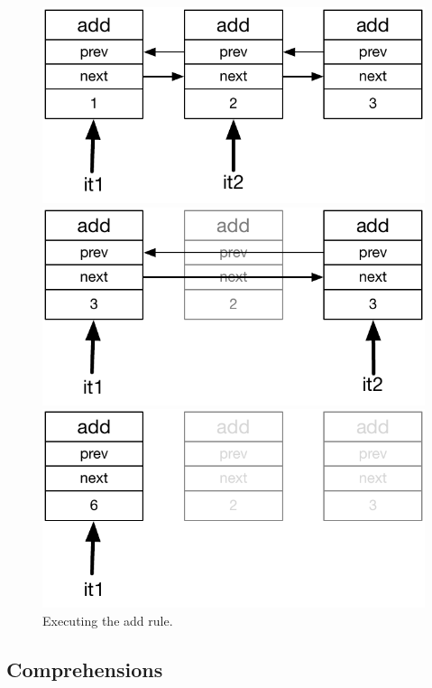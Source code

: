 \begin{figure}
\centering
\begin{minipage}{.5\textwidth}
  \centering
  \includegraphics[width=.8\linewidth]{figures/update}
\end{minipage}%
\begin{minipage}{.5\textwidth}
  \centering
  \includegraphics[width=0.8\linewidth]{figures/update2}
\end{minipage}
\begin{minipage}{.5\textwidth}
   \centering
  \includegraphics[width=0.8\linewidth]{figures/update3}
\end{minipage}
\caption{Executing the add rule.  }
\label{fig:update_add}
\end{figure}

\subsection{Comprehensions}

